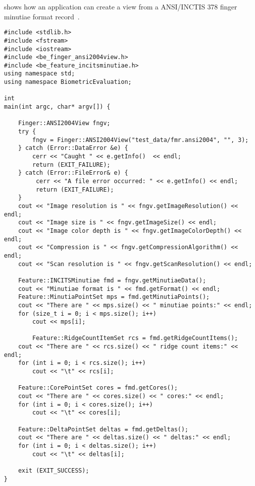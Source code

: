  shows how an application can create a view from
a ANSI/INCTIS 378 finger minutiae format record~\cite{std:ansi378-2004}.

\begin{lstlisting}[caption={Using an INCITS Finger View}, label=lst:incitsfingerviewuse]
#include <stdlib.h>
#include <fstream>
#include <iostream>
#include <be_finger_ansi2004view.h>
#include <be_feature_incitsminutiae.h>
using namespace std;
using namespace BiometricEvaluation;

int
main(int argc, char* argv[]) {

    Finger::ANSI2004View fngv;
    try {
        fngv = Finger::ANSI2004View("test_data/fmr.ansi2004", "", 3);
    } catch (Error::DataError &e) {
        cerr << "Caught " << e.getInfo()  << endl;
        return (EXIT_FAILURE);
    } catch (Error::FileError& e) {
         cerr << "A file error occurred: " << e.getInfo() << endl;
         return (EXIT_FAILURE);
    }
    cout << "Image resolution is " << fngv.getImageResolution() << endl;
    cout << "Image size is " << fngv.getImageSize() << endl;
    cout << "Image color depth is " << fngv.getImageColorDepth() << endl;
    cout << "Compression is " << fngv.getCompressionAlgorithm() << endl;
    cout << "Scan resolution is " << fngv.getScanResolution() << endl;
    
    Feature::INCITSMinutiae fmd = fngv.getMinutiaeData();
    cout << "Minutiae format is " << fmd.getFormat() << endl;
    Feature::MinutiaPointSet mps = fmd.getMinutiaPoints();
    cout << "There are " << mps.size() << " minutiae points:" << endl;
    for (size_t i = 0; i < mps.size(); i++)
        cout << mps[i];

        Feature::RidgeCountItemSet rcs = fmd.getRidgeCountItems();
    cout << "There are " << rcs.size() << " ridge count items:" << endl;
    for (int i = 0; i < rcs.size(); i++)
        cout << "\t" << rcs[i];

    Feature::CorePointSet cores = fmd.getCores();
    cout << "There are " << cores.size() << " cores:" << endl;
    for (int i = 0; i < cores.size(); i++)
        cout << "\t" << cores[i];

    Feature::DeltaPointSet deltas = fmd.getDeltas();
    cout << "There are " << deltas.size() << " deltas:" << endl;
    for (int i = 0; i < deltas.size(); i++)
        cout << "\t" << deltas[i];

    exit (EXIT_SUCCESS);
}
\end{lstlisting}
